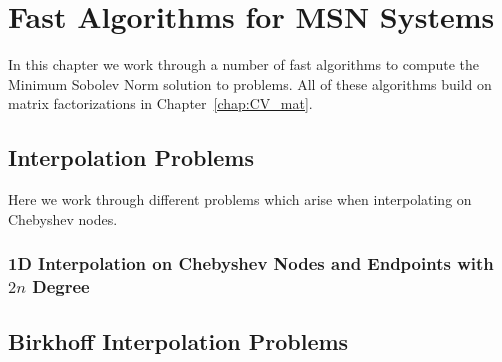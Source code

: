 \chapter{Fast Algorithms for MSN Systems}
\label{chap:fast_alg}

In this chapter we work through a number of fast algorithms to compute
the Minimum Sobolev Norm solution to problems. All of these algorithms
build on matrix factorizations in Chapter~\ref{chap:CV_mat}.

\section{Interpolation Problems}

Here we work through different problems which arise when
interpolating on Chebyshev nodes.



\subsection{1D Interpolation on Chebyshev Nodes and Endpoints with $2n$ Degree}



\section{Birkhoff Interpolation Problems}


